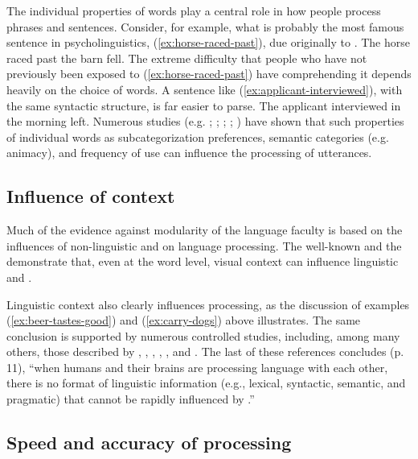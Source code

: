 \documentclass[output=paper
	        ,collection
	        ,collectionchapter
 	        ,biblatex
                ,babelshorthands
                ,newtxmath
                ,draftmode
                ,colorlinks, citecolor=brown
]{langscibook}
\begin{document}
The individual properties of words play a central role in how people process phrases and sentences.  Consider, for example, what is probably the most famous sentence in psycholinguistics, (\ref{ex:horse-raced-past}), due originally to \citep{Bever70}.
\ea\label{ex:horse-raced-past}
The horse raced past the barn fell.
\z
The extreme difficulty that people who have not previously been exposed to (\ref{ex:horse-raced-past}) have comprehending it depends heavily on the choice of words.  A sentence like (\ref{ex:applicant-interviewed}), with the same syntactic structure, is far easier to parse.
\ea\label{ex:applicant-interviewed}
The applicant interviewed in the morning left.
\z
Numerous studies (e.g. \citealt{FordEtal82}; \citealt{TrueswellEtal93}; \citealt{MPS94a-u}; \citealt{BresnanEtal2007}; \citealt{WasowEtal2011}) have shown that such properties of individual words as subcategorization preferences, semantic categories (e.g. animacy), and frequency of use can influence the processing of utterances.  

\subsection{Influence of context}

Much of the evidence against modularity of the language faculty is based on the influences of non-linguistic  and  on language processing.  The well-known  \citep{McGurkMacDonald76} and the  \citep{Stroop35} demonstrate that, even at the word level, visual context can influence linguistic  and .

Linguistic context also clearly influences processing, as the discussion of examples (\ref{ex:beer-tastes-good}) and (\ref{ex:carry-dogs}) above illustrates.  The same conclusion is supported by numerous controlled studies, including,
among many others, those described by \citet{CS85a}, \citet{AltmannSteedman88}, \citet{Branigan2007}, \citet{Tooley2007a}, \citet{MatsukiEtal2011}, and \citet{SpevackEtal2018}.  The last of these references concludes (p.\,11), ``when humans and their brains are processing language with each other, there is no format of linguistic information (e.g., lexical, syntactic, semantic, and pragmatic) that cannot be rapidly
influenced by .''

\subsection{Speed and accuracy of processing}
\end{document}
